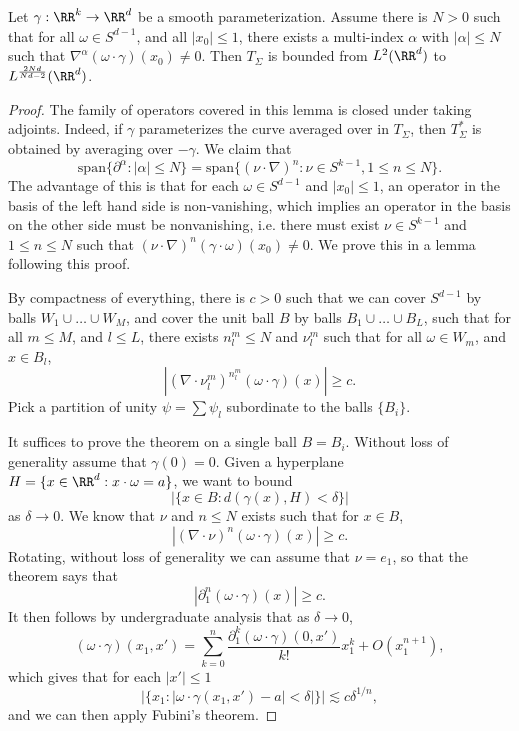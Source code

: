 \begin{theorem}
    Let $\gamma: \RR^k \to \RR^d$ be a smooth parameterization. Assume there is $N > 0$ such that for all $\omega \in S^{d-1}$, and all $|x_0| \leq 1$, there exists a multi-index $\alpha$ with $|\alpha| \leq N$ such that $\nabla^\alpha(\omega \cdot \gamma)(x_0) \neq 0$. Then $T_\Sigma$ is bounded from $L^2(\RR^d)$  to $L^{\frac{2Nd}{Nd-2}}(\RR^d)$.
\end{theorem}
\begin{proof}
    The family of operators covered in this lemma is closed under taking adjoints. Indeed, if $\gamma$ parameterizes the curve averaged over in $T_\Sigma$, then $T_\Sigma^*$ is obtained by averaging over $- \gamma$. We claim that
    \[\text{span} \{ \partial^\alpha : |\alpha| \leq N \} = \text{span} \{ (\nu \cdot \nabla)^n : \nu \in S^{k-1}, 1 \leq n \leq N \}. \]
    The advantage of this is that for each $\omega \in S^{d-1}$ and $|x_0| \leq 1$, an operator in the basis of the left hand side is non-vanishing, which implies an operator in the basis on the other side must be nonvanishing, i.e. there must exist $\nu \in S^{k-1}$ and $1 \leq n \leq N$ such that $(\nu \cdot \nabla)^n (\gamma \cdot \omega)(x_0) \neq 0$. We prove this in a lemma following this proof.

    By compactness of everything, there is $c > 0$ such that we can cover $S^{d-1}$ by balls $W_1 \cup \dots \cup W_M$, and cover the unit ball $B$ by balls $B_1 \cup \dots \cup B_L$, such that for all $m \leq M$, and $l \leq L$, there exists $n^m_l \leq N$ and $\nu^m_l$ such that for all $\omega \in W_m$, and $x \in B_l$,
    \[ |(\nabla \cdot \nu^m_l)^{n^m_l}(\omega \cdot \gamma)(x)| \geq c. \]
    Pick a partition of unity $\psi = \sum \psi_l$ subordinate to the balls $\{ B_i \}$.

    It suffices to prove the theorem on a single ball $B = B_i$. Without loss of generality assume that $\gamma(0) = 0$. Given a hyperplane $H = \{ x \in \RR^d: x \cdot \omega = a \}$, we want to bound
    \[ |\{ x \in B : d(\gamma(x), H) < \delta \}| \]
    as $\delta \to 0$. We know that $\nu$ and $n \leq N$ exists such that for $x \in B$,
    \[ |(\nabla \cdot \nu)^n (\omega \cdot \gamma)(x)| \geq c. \]
    Rotating, without loss of generality we can assume that $\nu = e_1$, so that the theorem says that
    \[ |\partial_1^n (\omega \cdot \gamma)(x)| \geq c. \]
    It then follows by undergraduate analysis that as $\delta \to 0$,
    \[ (\omega \cdot \gamma)(x_1,x') = \sum_{k = 0}^n \frac{\partial_1^k (\omega \cdot \gamma)(0,x')}{k!} x_1^k + O(x_1^{n+1}), \]
    which gives that for each $|x'| \leq 1$
    \[ |\{ x_1: |\omega \cdot \gamma(x_1,x') - a| < \delta| \}| \lesssim c \delta^{1/n}, \]
    and we can then apply Fubini's theorem.


\end{proof}
